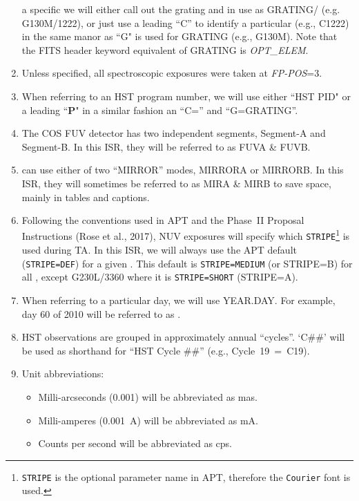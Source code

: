 \begin{enumerate}
{	a specific \cenwave{} we will either call out the grating and \cenwave{} in use as GRATING/\cenwave{}  (e.g. G130M/1222), or just use a leading ``C'' to identify a particular \cenwave{} (e.g., C1222) in the same manor as ``G" is used for GRATING (e.g., G130M).
	Note that the FITS header keyword equivalent of GRATING is \textit{OPT\_ELEM}.}
	\item{Unless specified, all spectroscopic exposures were taken at \textit{FP-POS}=3.}
	\item{When referring to an HST program number, we will use either ``HST PID" or a leading ``{\bf P}" in a similar fashion an ``C=\cenwave{}'' and ``G=GRATING''.}
	\item{The COS FUV detector has two independent segments, Segment-A and Segment-B. In this ISR, they will be referred to as FUVA \& FUVB.}
	\item{ can use either of two ``MIRROR'' modes, MIRRORA or MIRRORB. In this ISR, they will sometimes be referred to as MIRA \& MIRB to save space, mainly in tables and captions.}
	\item{Following the conventions used in APT and the Phase~II Proposal Instructions (Rose et al., 2017), NUV  exposures will specify which \texttt{STRIPE}\footnote{\texttt{STRIPE} is the optional parameter name in APT, therefore the \texttt{Courier} font is used.} is used during TA. In this ISR, we will always use
	the APT default (\texttt{STRIPE=DEF}) for a given \cenwave{}. This default is \texttt{STRIPE=MEDIUM} (or STRIPE=B) for all \cenwaves{}, except G230L/3360 where it is \texttt{STRIPE=SHORT} (STRIPE=A).}
	\item{When referring to a particular day, we will use YEAR.DAY. For example, day 60 of 2010 will be referred to as \psiafdate.
	}
	\item{HST observations are grouped in approximately annual ``cycles''. `C\#\#' will be used as shorthand for ``HST Cycle \#\#'' (e.g., Cycle~19~=~C19).}
	\item{Unit abbreviations:
		\begin{itemize}
		\item{Milli-arcseconds (0.001\arcsec) will be abbreviated as mas.}
		\item{Milli-amperes (0.001~A) will be abbreviated as mA.}
		\item{Counts per second will be abbreviated as cps.}
		\end{itemize}
}
\end{enumerate}
